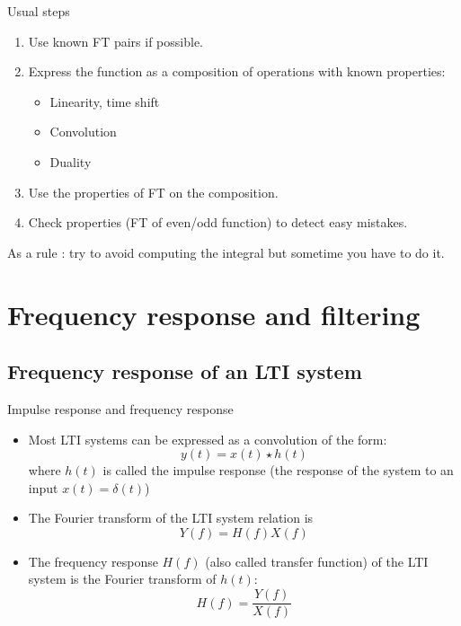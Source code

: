   \begin{block}{Usual steps}
    \begin{enumerate}
      \item Use known FT pairs if possible.
      \item Express the function as a composition of operations with known properties:
        \begin{itemize}
          \item Linearity, time shift
          \item Convolution
          \item Duality
        \end{itemize}
      \item Use the properties of FT on the composition.
      \item Check properties (FT of even/odd function) to detect easy mistakes.
    \end{enumerate}
    As a rule : try to avoid computing the integral but sometime you have to do it.
  \end{block}

   

\section{Frequency response and filtering}
\label{sec:freq-response}

\subsection{Frequency response of an LTI system}
\label{sec:}

\begin{block}{Impulse response and frequency response}
    \begin{itemize}
      \item Most LTI systems can be expressed as a convolution of the form:
     $$y(t)=x(t)\star h(t)$$
     where $h(t)$ is called the impulse response (the response of the system to an input $x(t)=\delta(t)$)
     \item The Fourier transform of the LTI system relation is
     \begin{equation}
      \label{eq:rep_freq_syst}
      Y(f)=H(f)X(f)
    \end{equation}
    \item The frequency response $H(f)$ (also called transfer function) of the LTI system is the Fourier transform of $h(t)$:
    \begin{equation}
      \label{eq:rep_freq_syst2}
      H(f)=\frac{Y(f)}{X(f)}
    \end{equation}
    \end{itemize}

  \end{block}


